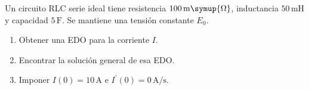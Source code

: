 Un circuito RLC serie ideal tiene resistencia \(100\,\mathrm{m}\symup{\Omega}\), inductancia \(50\,\mathrm{mH}\) y capacidad \(5\,\mathrm F\). Se mantiene una tensión constante \(E_0\).

\begin{enumerate}[label=(\alph*),ref=\alph*,leftmargin=*]
\item Obtener una EDO para la corriente \(I\).
\item Encontrar la solución general de esa EDO.
\item Imponer \(I(0)=10\,\mathrm A\) e \(I^{\prime}(0)=0\,\mathrm{A/s}\).
\end{enumerate}
